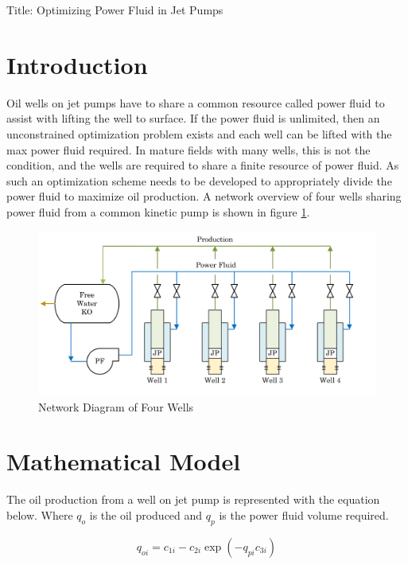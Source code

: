 \documentclass{article}
\begin{document}
\begin{center}
    \Large Title: Optimizing Power Fluid in Jet Pumps \par
\end{center}

\section{Introduction}

Oil wells on jet pumps have to share a common resource called power fluid to assist with lifting the well to surface. If the power fluid is unlimited, then an unconstrained optimization problem exists and each well can be lifted with the max power fluid required. In mature fields with many wells, this is not the condition, and the wells are required to share a finite resource of power fluid. As such an optimization scheme needs to be developed to appropriately divide the power fluid to maximize oil production. A network overview of four wells sharing power fluid from a common kinetic pump is shown in figure \ref{fig:jetpump_network}.

\begin{figure}[H]
    \centering
    \includegraphics[width=1\linewidth]{figures/network_diagram.PNG}
    \caption{Network Diagram of Four Wells}
    \label{fig:jetpump_network}
\end{figure}

\section{Mathematical Model}

The oil production from a well on jet pump is represented with the equation below. Where $q_{o}$ is the oil produced and $q_{p}$ is the power fluid volume required.

\begin{equation*}
    q_{oi} = c_{1i} - c_{2i} \exp{(-q_{pi} c_{3i})}
\end{equation*}
\end{document}
